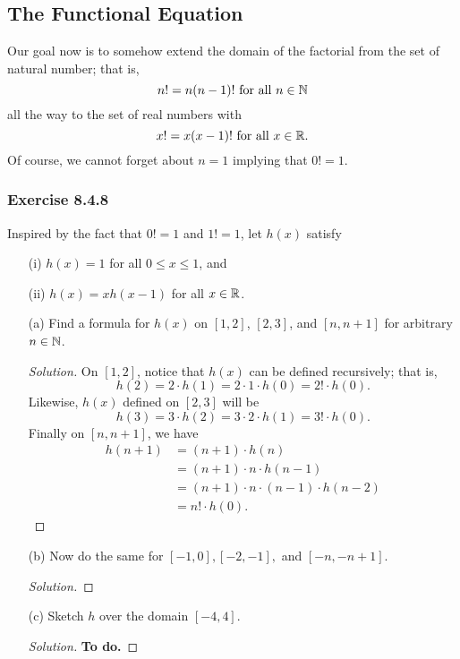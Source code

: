 \subsection{The Functional Equation}

Our goal now is to somehow extend the domain of the factorial from the set of natural number; that is, 
\[  n! = n (n-1)! \ \text{for all }  n \in \mathbb{N}   \] 
all the way to the set of real numbers with 
\[  x! = x(x-1)! \ \text {for all } x \in \mathbb{R}. \]
Of course, we cannot forget about \(  n = 1   \) implying that \( 0! = 1  \).

\subsubsection{Exercise 8.4.8} Inspired by the fact that \( 0! = 1  \) and \( 1! = 1  \), let \( h(x)  \) satisfy 
\begin{enumerate}
    \item[(i)] \( h(x) = 1  \) for all \( 0 \leq x \leq 1  \), and 
    \item[(ii)] \( h(x) = x h(x-1)  \) for all \( x \in \mathbb{R}  \).
\end{enumerate}
\begin{enumerate}
    \item[(a)] Find a formula for \( h(x)  \) on \( [1,2]  \), \( [2,3]  \), and \( [n, n +1 ] \) for arbitrary \( n \in \mathbb{N}  \).
        \begin{proof}[Solution]
            On \( [1,2]  \), notice that \( h(x)  \) can be defined recursively; that is, 
            \[  h(2) = 2 \cdot h(1) = 2 \cdot 1 \cdot h(0) = 2! \cdot h(0). \]
            Likewise, \( h(x)  \) defined on \( [2,3]  \) will be 
            \[  h(3) = 3 \cdot h(2) = 3 \cdot 2 \cdot h(1) = 3! \cdot h(0). \]
            Finally on \( [n, n+ 1]  \), we have 
            \begin{align*}
                h(n+1) &= (n+1) \cdot h(n)  \\
                       &= (n+1) \cdot n \cdot h(n-1) \\
                       &= (n+1) \cdot n \cdot (n-1) \cdot h(n-2) \\
                       &= n! \cdot h(0).
            \end{align*}
        \end{proof}
    \item[(b)] Now do the same for \( [-1,0], [-2,-1] , \) and \( [-n, -n+1]  \).
        \begin{proof}[Solution] 
        
        \end{proof}
    \item[(c)] Sketch \( h  \) over the domain \( [-4,4]  \).
        \begin{proof}[Solution]
            \textbf{To do.}
        \end{proof}
\end{enumerate}

